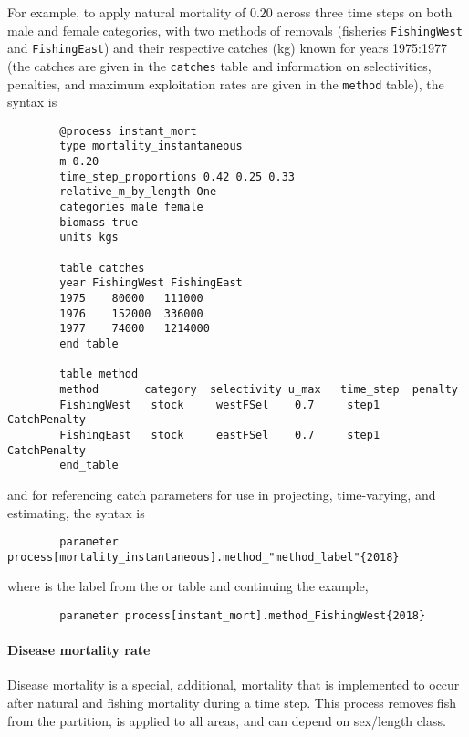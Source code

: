 For example, to apply natural mortality of $0.20$ across three time steps on both male and female categories, with two methods of removals (fisheries \texttt{FishingWest} and \texttt{FishingEast}) and their respective catches (kg) known for years 1975:1977 (the catches are given in the \texttt{catches} table and information on selectivities, penalties, and maximum exploitation rates are given in the \texttt{method} table), the syntax is

{\small{\begin{verbatim}
		@process instant_mort
		type mortality_instantaneous
		m 0.20
		time_step_proportions 0.42 0.25 0.33
		relative_m_by_length One
		categories male female
		biomass true
		units kgs
		
		table catches
		year FishingWest FishingEast
		1975	80000	111000
		1976	152000	336000
		1977	74000	1214000
		end table
		
		table method
		method       category  selectivity u_max   time_step  penalty
		FishingWest   stock     westFSel    0.7     step1     CatchPenalty
		FishingEast   stock     eastFSel    0.7     step1     CatchPenalty
		end_table
		\end{verbatim}}}

and for referencing catch parameters for use in projecting, time-varying, and estimating, the syntax is

{\small{\begin{verbatim}
		parameter process[mortality_instantaneous].method_"method_label"{2018}
		\end{verbatim}}}

where  is the label from the  or  table and continuing the example,

{\small{\begin{verbatim}
		parameter process[instant_mort].method_FishingWest{2018}
		\end{verbatim}}}

\paragraph{Disease mortality rate}\label{sec:Process-Length-DiseaseMortalityRate}

Disease mortality is a special, additional, mortality that is implemented to occur after natural and fishing mortality during a time step. This process removes fish from the partition, is applied to all areas, and can depend on sex/length class.

